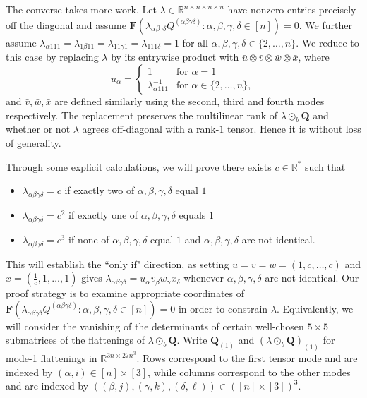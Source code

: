 \documentclass[11pt]{amsart}
\begin{document}
The converse takes more work. 
Let $\lambda \in \mathbb{R}^{n \times n \times n \times n}$ have nonzero entries precisely off the diagonal and assume $\mathbf{F}(\lambda_{\alpha \beta \gamma \delta} Q^{(\alpha \beta \gamma \delta)} : \alpha, \beta, \gamma, \delta \in [n]) = 0$.
We further assume $\lambda_{\alpha 1 1 1 } = \lambda_{1 \beta 1 1} = \lambda_{1 1 \gamma 1} = \lambda_{1 1 1 \delta}=1$ for all $\alpha, \beta, \gamma, \delta \in \{2, \ldots, n\}$.
We reduce to this case by replacing $\lambda$ by its entrywise product with $\bar{u} \otimes \bar{v} \otimes \bar{w} \otimes \bar{x}$, where 
\begin{equation*}
\bar{u}_{\alpha} = \begin{cases} 
1 & \text{for } \alpha = 1\\
\lambda_{\alpha 1 1 1}^{-1} & \text{for } \alpha \in \{2, \dots, n\}, 
\end{cases}
\end{equation*}
and $\bar{v}, \bar{w}, \bar{x}$ are defined similarly using the second, third and fourth modes respectively. 
The replacement preserves the multilinear rank of $\lambda \odot_b \mathbf{Q}$ and whether or not $\lambda$ agrees off-diagonal with a rank-$1$ tensor.  Hence it is without loss of generality.


Through some explicit calculations, we will prove there exists $c \in \mathbb{R}^*$ such that
\begin{itemize}
    \item $\lambda_{\alpha \beta \gamma \delta} = c$ if exactly two of $\alpha, \beta, \gamma, \delta$ equal $1$
    \item $\lambda_{\alpha \beta \gamma \delta} = c^2$ if exactly one of $\alpha, \beta, \gamma, \delta$ equals $1$
    \item $\lambda_{\alpha \beta \gamma \delta} = c^3$ if none of $\alpha, \beta, \gamma, \delta$ equal $1$ and $\alpha, \beta, \gamma, \delta$ are not identical.
\end{itemize}
This will establish the ``only if" direction, as setting $u = v= w= (1, c, \ldots, c)$ and $x= (\tfrac{1}{c}, 1, \ldots, 1)$ gives $\lambda_{\alpha \beta \gamma \delta} = u_{\alpha} v_{\beta} w_{\gamma} x_{\delta}$ whenever $\alpha, \beta, \gamma, \delta$ are not identical.
Our proof strategy is to examine appropriate coordinates 
of $\mathbf{F}(\lambda_{\alpha \beta \gamma \delta} Q^{(\alpha \beta \gamma \delta)} : \alpha, \beta, \gamma, \delta \in [n]) = 0$ in order to constrain $\lambda$.
Equivalently, we will consider the vanishing of the determinants of certain well-chosen $5 \times 5$ submatrices of the flattenings of $\lambda \odot_b \mathbf{Q}$.  
Write $\mathbf{Q}_{(1)}$ and $(\lambda \odot_b \mathbf{Q})_{(1)}$ for mode-1 flattenings in $\mathbb{R}^{3n \times 27n^3}$.  
Rows correspond to the first tensor mode and are indexed by $(\alpha, i) \in [n] \times [3]$, while columns correspond to the other  modes and are indexed by $((\beta, j), (\gamma, k), (\delta, \ell)) \in ([n] \times [3])^{3}$.
\end{document}

